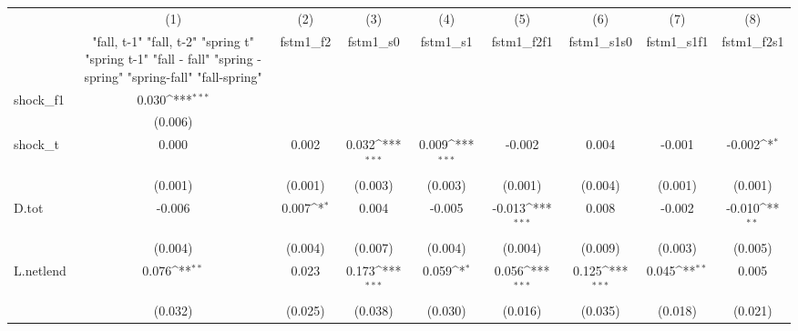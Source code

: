 {
\def\sym#1{\ifmmode^{#1}\else\(^{#1}\)\fi}
\begin{tabular}{l*{8}{c}}
\toprule
            &\multicolumn{1}{c}{(1)}&\multicolumn{1}{c}{(2)}&\multicolumn{1}{c}{(3)}&\multicolumn{1}{c}{(4)}&\multicolumn{1}{c}{(5)}&\multicolumn{1}{c}{(6)}&\multicolumn{1}{c}{(7)}&\multicolumn{1}{c}{(8)}\\
            &\multicolumn{1}{c}{  "fall, t-1" "fall, t-2" "spring t" "spring t-1"  "fall - fall" "spring - spring" "spring-fall" "fall-spring" }&\multicolumn{1}{c}{fstm1\_f2}&\multicolumn{1}{c}{fstm1\_s0}&\multicolumn{1}{c}{fstm1\_s1}&\multicolumn{1}{c}{fstm1\_f2f1}&\multicolumn{1}{c}{fstm1\_s1s0}&\multicolumn{1}{c}{fstm1\_s1f1}&\multicolumn{1}{c}{fstm1\_f2s1}\\
\midrule
shock\_f1    &       0.030\sym{***}&                     &                     &                     &                     &                     &                     &                     \\
            &     (0.006)         &                     &                     &                     &                     &                     &                     &                     \\
\addlinespace
shock\_t     &       0.000         &       0.002         &       0.032\sym{***}&       0.009\sym{***}&      -0.002         &       0.004         &      -0.001         &      -0.002\sym{*}  \\
            &     (0.001)         &     (0.001)         &     (0.003)         &     (0.003)         &     (0.001)         &     (0.004)         &     (0.001)         &     (0.001)         \\
\addlinespace
D.tot       &      -0.006         &       0.007\sym{*}  &       0.004         &      -0.005         &      -0.013\sym{***}&       0.008         &      -0.002         &      -0.010\sym{**} \\
            &     (0.004)         &     (0.004)         &     (0.007)         &     (0.004)         &     (0.004)         &     (0.009)         &     (0.003)         &     (0.005)         \\
\addlinespace
L.netlend   &       0.076\sym{**} &       0.023         &       0.173\sym{***}&       0.059\sym{*}  &       0.056\sym{***}&       0.125\sym{***}&       0.045\sym{**} &       0.005         \\
            &     (0.032)         &     (0.025)         &     (0.038)         &     (0.030)         &     (0.016)         &     (0.035)         &     (0.018)         &     (0.021)         \\

\end{tabular}}
